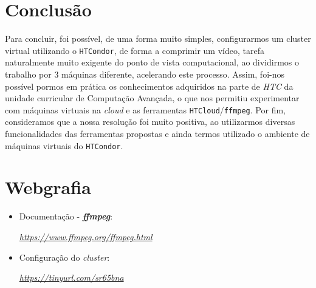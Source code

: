 \documentclass[a4paper]{report}
\begin{document}
\chapter{Conclusão}
\large{
	Para concluir, foi possível, de uma forma muito simples, configurarmos um cluster virtual utilizando o \texttt{HTCondor}, de forma a comprimir um vídeo, tarefa naturalmente muito exigente do ponto de vista computacional, ao dividirmos o trabalho por 3 máquinas diferente, acelerando este processo.
	Assim, foi-nos possível pormos em prática os conhecimentos adquiridos na parte de \textit{HTC} da unidade curricular de Computação Avançada, o que nos permitiu experimentar com máquinas virtuais na \textit{cloud} e as ferramentas \texttt{HTCloud}/\texttt{ffmpeg}.
	Por fim, consideramos que a nossa resolução foi muito positiva, ao utilizarmos diversas funcionalidades das ferramentas propostas e ainda termos utilizado o ambiente de máquinas virtuais do \texttt{HTCondor}.
}

\chapter{Webgrafia}
    \begin{itemize}
        \item Documentação - \textbf{\textit{ffmpeg}}:
		\par \textit{\url{https://www.ffmpeg.org/ffmpeg.html}}
		
		\item Configuração do \textit{cluster}:
		\par \textit{\url{https://tinyurl.com/sr65bna}}
    \end{itemize}
\end{document}
